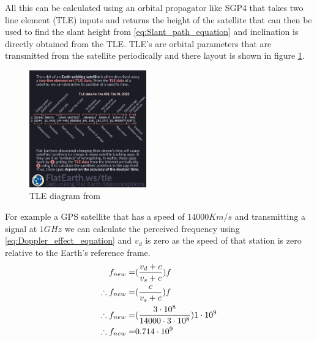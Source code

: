 \documentclass[conference]{IEEEtran}
\begin{document}
All this can be calculated using an orbital propagator like SGP4 that takes two line element (TLE) inputs and returns the height of the satellite that can then be used to find the slant height from \ref{eq:Slant_path_equation} and inclination is directly obtained from the TLE. TLE's are orbital parameters that are transmitted from the satellite periodically and there layout is shown in figure \ref{fig:TLE}.

\begin{figure}[h]
\centering
	\includegraphics[width = 0.45\textwidth]{TLE.png}
	\caption{TLE diagram from \cite{TLE_flat_earth}}
	\label{fig:TLE}
\end{figure}

For example a GPS satellite that has a speed of $14000 Km/s$ and transmitting a signal at $1G Hz$ we can calculate the perceived frequency using \ref{eq:Doppler_effect_equation} and $v_d$ is zero as the speed of that station is zero relative to the Earth's reference frame.\\

\begin{equation}
\centering
\begin{split}
f_{new} =& (\frac{v_d+c}{v_s+c}) f\\
\therefore f_{new} =& (\frac{c}{v_s+c})f\\
\therefore f_{new} = &(\frac{3\cdot 10^8}{14000 \cdot 3\cdot10^8}) 1\cdot 10^9\\
\therefore f_{new} =& 0.714\cdot  10^9
\end{split}
\label{eq:Doppler_example}
\end{equation}

\label{sec:Orbital}


\end{document}

